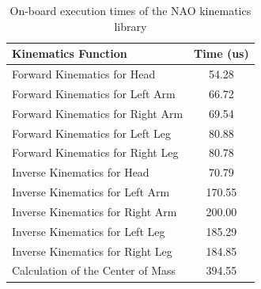 
\begin{table}[!t]
\caption{On-board execution times of the NAO kinematics library}
\label{times}
\begin{center}
\begin{tabularx}{9.3cm}{lc}
\toprule%
\textbf{Kinematics Function} & \textbf{Time (us)}\\
\midrule [\heavyrulewidth]%
Forward Kinematics for Head & 54.28 \\
Forward Kinematics for Left Arm & 66.72 \\
Forward Kinematics for Right Arm & 69.54 \\
Forward Kinematics for Left Leg & 80.88 \\
Forward Kinematics for Right Leg & 80.78 \\
Inverse Kinematics for Head & 70.79 \\
Inverse Kinematics for Left Arm & 170.55 \\
Inverse Kinematics for Right Arm & 200.00 \\
Inverse Kinematics for Left Leg & 185.29 \\
Inverse Kinematics for Right Leg & 184.85 \\
Calculation of the Center of Mass & 394.55 \\
\bottomrule%
\end{tabularx}
\end{center}
\end{table}


